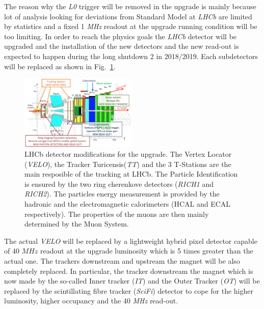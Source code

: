 \documentclass[paper=a4, fontsize=10pt]{scrartcl}
\numberwithin{equation}{section}		%
\numberwithin{figure}{section}			%
\numberwithin{table}{section}				%
\begin{document}
The reason why the \textit{L0} trigger will be removed in the upgrade is mainly because lot of analysis looking for deviations from Standard Model at \textit{LHCb} are limited by statistics and a fixed 1 \textit{MHz} readout at the upgrade running condition will be too limiting. 
In order to reach the physics goals the \textit{LHCb} detector will be upgraded and the installation of the new detectors and the new read-out is expected to happen during the long shutdown 2 in 2018/2019.
Each subdetectors will be replaced as shown in Fig.~\ref{Fig:Upgrade}.
\begin{figure}[h]
  \begin{center}
    \includegraphics[width=0.5\textwidth]{Images/Upgrade.png} 
  \caption[Caption for track type]{LHCb detector modifications for the upgrade. The Vertex Locator (\textit{VELO}), the Tracker Turicensis(\textit{TT}) and the 3 T-Stations are the main resposible of the tracking at LHCb. The Particle Identification is ensured by the two ring cherenkove detectors (\textit{RICH1} and \textit{RICH2}). The particles energy measurement is provided by the hadronic and the electromagnetic calorimeters (HCAL and ECAL respectively). The properties of the muons are then mainly determined by the Muon System.}\label{Fig:Upgrade}
  \end{center}
\end{figure}

The actual \textit{VELO} will be replaced by a lightweight hybrid pixel detector capable of 40 $MHz$ readout at the upgrade luminosity which is 5 times greater than the actual one.
The trackers downstream and upstream the magnet will be also completely replaced. In particular, the tracker downstream the magnet which is now made by the so-called Inner tracker (\textit{IT}) and the Outer Tracker (\textit{OT}) will be replaced by the scintillating fibre tracker (\textit{SciFi}) detector to cope for the higher luminosity, higher occupancy and the 40 \textit{MHz} read-out.
\end{document}
